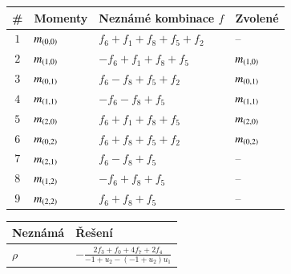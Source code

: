 \begin{table}[!h]
	\centering
	\begin{tabular}{c l l l}
		\toprule
		\# & Momenty & Neznámé kombinace $f$ & Zvolené\\
		\midrule
		\multirow{ 1}{*}{$1$} & \multirow{ 1}{*}{$m_{\left(0,0\right)}$} & $f_6+f_1+f_8+f_5+f_2$ & \multirow{ 1}{*}{--}\\ 
		\midrule
		\multirow{ 1}{*}{$2$} & \multirow{ 1}{*}{$m_{\left(1,0\right)}$} & $-f_6+f_1+f_8+f_5$ & \multirow{ 1}{*}{$m_{\left(1,0\right)}$}\\ 
		\midrule
		\multirow{ 1}{*}{$3$} & \multirow{ 1}{*}{$m_{\left(0,1\right)}$} & $f_6-f_8+f_5+f_2$ & \multirow{ 1}{*}{$m_{\left(0,1\right)}$}\\ 
		\midrule
		\multirow{ 1}{*}{$4$} & \multirow{ 1}{*}{$m_{\left(1,1\right)}$} & $-f_6-f_8+f_5$ & \multirow{ 1}{*}{$m_{\left(1,1\right)}$}\\ 
		\midrule
		\multirow{ 1}{*}{$5$} & \multirow{ 1}{*}{$m_{\left(2,0\right)}$} & $f_6+f_1+f_8+f_5$ & \multirow{ 1}{*}{$m_{\left(2,0\right)}$}\\ 
		\midrule
		\multirow{ 1}{*}{$6$} & \multirow{ 1}{*}{$m_{\left(0,2\right)}$} & $f_6+f_8+f_5+f_2$ & \multirow{ 1}{*}{$m_{\left(0,2\right)}$}\\ 
		\midrule
		\multirow{ 1}{*}{$7$} & \multirow{ 1}{*}{$m_{\left(2,1\right)}$} & $f_6-f_8+f_5$ & \multirow{ 1}{*}{--}\\ 
		\midrule
		\multirow{ 1}{*}{$8$} & \multirow{ 1}{*}{$m_{\left(1,2\right)}$} & $-f_6+f_8+f_5$ & \multirow{ 1}{*}{--}\\ 
		\midrule
		\multirow{ 1}{*}{$9$} & \multirow{ 1}{*}{$m_{\left(2,2\right)}$} & $f_6+f_8+f_5$ & \multirow{ 1}{*}{--}\\ 
		\bottomrule
\end{tabular}\end{table}

\begin{table}[!h]
	\centering
	\begin{tabular}{l l}
		\toprule
		Neznámá & Řešení\\
		\midrule
		$\rho$ & $-\frac{2 f_3+f_0+4 f_7+2 f_4}{-1+u_2- {(-1+u_2)} u_1}$ \\ 
		\bottomrule
\end{tabular}\end{table}

